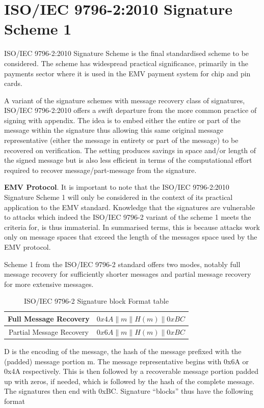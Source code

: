 \documentclass[]{final_report}
\theoremstyle{definition}
\begin{document}
\section{ISO/IEC 9796-2:2010 Signature Scheme 1}
ISO/IEC 9796-2:2010 Signature Scheme is the final standardised scheme to be considered. The scheme has widespread practical significance, primarily in the payments sector where it is used in the EMV payment system for chip and pin cards. 

A variant of the signature schemes with message recovery class of signatures, ISO/IEC 9796-2:2010 offers a swift departure from the more common practice of signing with appendix. The idea is to embed either the entire or part of the message within the signature thus allowing this same original message representative (either the message in entirety or part of the message) to be recovered on verification. The setting produces savings in space and/or length of the signed message but is also less efficient in terms of the computational effort required to recover message/part-message from the signature.

\textbf{EMV Protocol}. It is important to note that the ISO/IEC 9796-2:2010 Signature Scheme 1 will only be considered in the context of its practical application to the EMV standard. Knowledge that the signatures are vulnerable to attacks which indeed the ISO/IEC 9796-2 variant of the scheme 1 meets the criteria for, is thus immaterial. In summarised terms, this is because attacks work only on message spaces that exceed the length of the messages space used by the EMV protocol.

Scheme 1 from the ISO/IEC 9796-2 standard offers two modes, notably full message recovery for sufficiently shorter messages and partial message recovery for more extensive messages.


\begin{table}[H]
    \centering
    \caption{ISO/IEC 9796-2 Signature block Format table}
    \begin{tabular}{|c|c|}
    \hline
    Full Message Recovery & $0x4A\|m\|H(m)\|0xBC$ \\
    \hline
    Partial Message Recovery & $0x6A\|m\|H(m)\|0xBC$ \\
    \hline
    \end{tabular}
    \label{tab:sig_block_tab}
\end{table}
D is the encoding of the message, the hash of the message prefixed with the (padded) message portion m. The message representative begins with 0x6A or 0x4A respectively. This is then followed by a recoverable message portion padded up with zeros, if needed, which is followed by the hash of the complete message. The signatures then end with 0xBC. Signature “blocks” thus have the following format
\end{document}
